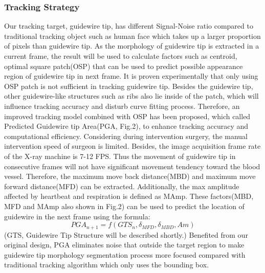 \documentclass[letterpaper, 10 pt, conference]{ieeeconf}  %
\begin{document}
\subsubsection{Tracking Strategy} 
Our tracking target, guidewire tip, has different Signal-Noise ratio compared to traditional tracking object such as human face which takes up a larger proportion of pixels than guidewire tip. As the morphology of guidewire tip is extracted in a current frame, the result will be used to calculate factors such as centroid, optimal square patch(OSP) that can be used to predict possible appearance region of guidewire tip in next frame. It is proven experimentally that only using OSP patch is not sufficient in tracking guidewire tip. Besides the guidewire tip, other guidewire-like structures such as ribs also lie inside of the patch, which will influence tracking accuracy and disturb curve fitting process. Therefore, an improved tracking model combined with OSP has been proposed, which called Predicted Guidewire tip Area(PGA, Fig.2), to enhance tracking accuracy and computational efficiency. Considering during intervention surgery, the manual intervention speed of surgeon is limited. Besides, the image acquisition frame rate of the X-ray machine is 7-12 FPS. Thus the movement of guidewire tip in consecutive frames will not have significant movement tendency toward the blood vessel. Therefore, the maximum move back distance(MBD) and maximum move forward distance(MFD) can be extracted. Additionally, the max amplitude affected by heartbeat and respiration is defined as MAmp. These factors(MBD, MFD and MAmp also shown in Fig.2) can be used to predict the location of guidewire in the next frame using the formula: $$PGA_{n+1} = f(GTS_{n}, \delta_{MFD}, \delta_{MBD}, Am)$$ (GTS, Guidewire Tip Structure will be described shortly.)
Benefited from our original design, PGA eliminates noise that outside the target region to make guidewire tip morphology segmentation process more focused compared with traditional tracking algorithm which only uses the bounding box.
\end{document}
